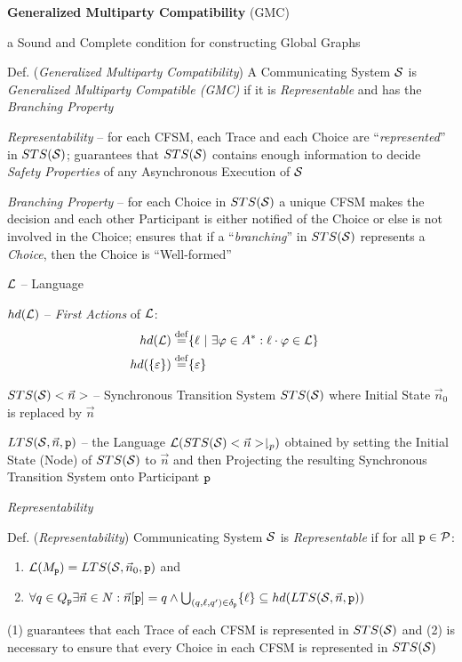 \textbf{Generalized Multiparty Compatibility} (GMC)

a Sound and Complete condition for constructing Global Graphs

Def. (\emph{Generalized Multiparty Compatibility}) A Communicating
System $\mathcal{S}$ is \emph{Generalized Multiparty Compatible (GMC)}
if it is \emph{Representable} and has the \emph{Branching Property}

\emph{Representability} -- for each CFSM, each Trace and each Choice
are ``\emph{represented}'' in $STS(\mathcal{S})$; guarantees that
$STS(\mathcal{S})$ contains enough information to decide \emph{Safety
  Properties} of any Asynchronous Execution of $\mathcal{S}$

\emph{Branching Property} -- for each Choice in $STS(\mathcal{S})$ a
unique CFSM makes the decision and each other Participant is either
notified of the Choice or else is not involved in the Choice; ensures
that if a ``\emph{branching}'' in $STS(\mathcal{S})$ represents a
\emph{Choice}, then the Choice is ``Well-formed''


$\mathcal{L}$ -- Language

$hd(\mathcal{L})$ -- \emph{First Actions} of $\mathcal{L}$:
\begin{align*}
  hd(\mathcal{L}) \stackrel{\mathrm{def}}=& \{ \ell \ |\ \exists\varphi \in A^*
    : \ell\cdot\varphi \in \mathcal{L} \} & \\
  hd(\{\varepsilon\}) \stackrel{\mathrm{def}}=& \{ \varepsilon \} &
\end{align*}

$STS(\mathcal{S})<\vec{n}>$ -- Synchronous Transition System
$STS(\mathcal{S})$ where Initial State $\vec{n}_0$ is replaced by
$\vec{n}$

$LTS(\mathcal{S},\vec{n},\mathtt{p})$ -- the Language
$\mathcal{L}(STS(\mathcal{S})<\vec{n}>\downharpoonright_p)$ obtained by
setting the Initial State (Node) of $STS(\mathcal{S})$ to $\vec{n}$ and
then Projecting the resulting Synchronous Transition System onto
Participant $\mathtt{p}$


\emph{Representability}

Def. (\emph{Representability}) Communicating System $\mathcal{S}$ is
\emph{Representable} if for all $\mathtt{p} \in \mathcal{P}$:
\begin{enumerate}
  \item $\mathcal{L}(M_\mathtt{p}) = LTS(\mathcal{S},\vec{n}_0,\mathtt{p})$ and
  \item $\forall q \in Q_\mathtt{p} \exists \vec{n} \in N :
    \vec{n}[\mathtt{p}] = q \wedge
      \bigcup_{(q,\ell,q')\in\delta_\mathtt{p}} \{ \ell \}
        \subseteq hd(LTS(\mathcal{S},\vec{n},\mathtt{p}))$
\end{enumerate}
(1) guarantees that each Trace of each CFSM is represented in
$STS(\mathcal{S})$ and (2) is necessary to ensure that every Choice in
each CFSM is represented in $STS(\mathcal{S})$

